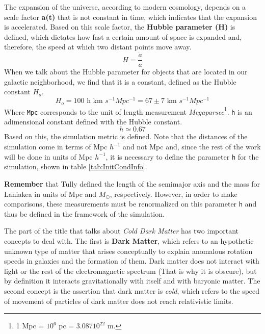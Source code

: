 The expansion of the universe, according to modern cosmology, depends on a scale factor \textbf{a(t)} that is not constant in time, which indicates that the expansion is accelerated. Based on this scale factor, the \textbf{Hubble parameter (H)} is defined, which dictates how fast a certain amount of space is expanded and, therefore, the speed at which two distant points move away.
\begin{equation}
    H = \frac{\dot{a}}{a}
\end{equation}
When we talk about the Hubble parameter for objects that are located in our galactic neighborhood, we find that it is a constant, defined as the Hubble constant \textbf{$H_o$}.
\begin{equation}
    H_o = \text{100 h km }s^{-1}  Mpc^{-1} = 67 \pm 7\text{ km } s^{-1}Mpc^{-1}
\end{equation}
Where \texttt{Mpc} corresponds to the unit of length measurement \emph{Megaparsec}\footnote{1 Mpc = $10^6$ pc = 3.087$10^{22}$ m.}. \texttt{h} is an adimensional constant defined with the Hubble constant.
\begin{equation}
    h \simeq 0.67
\end{equation}
Based on this, the simulation metric is defined. Note that the distances of the simulation come in terms of Mpc  $h^{-1}$ and not Mpc and, since the rest of the work will be done in units of Mpc $h^{-1}$, it is necessary to define the parameter \texttt{h} for the simulation, shown in table \ref{tab:InitCondInfo}.

\textbf{Remember} that Tully defined the length of the semimajor axis and the mass for Laniakea in units of Mpc and $M_{\odot}$, respectively\cite{tully_laniakea_2014}. However, in order to make comparisons, these measurements must be renormalized on this parameter \texttt{h} and thus be defined in the framework of the simulation.

The part of the title that talks about \emph{Cold Dark Matter} has two important concepts to deal with. The first is \textbf{Dark Matter}, which refers to an hypothetic unknown type of matter that arises conceptually to explain anomalous rotation speeds in galaxies and the formation of them\cite{GalaxyDM}. Dark matter does not interact with light or the rest of the electromagnetic spectrum (That is why it is obscure), but by definition it interacts gravitationally with itself and with baryonic matter. The second concept is the assertion that dark matter is \emph{cold}, which refers to the speed of movement of particles of dark matter does not reach relativistic limits.

